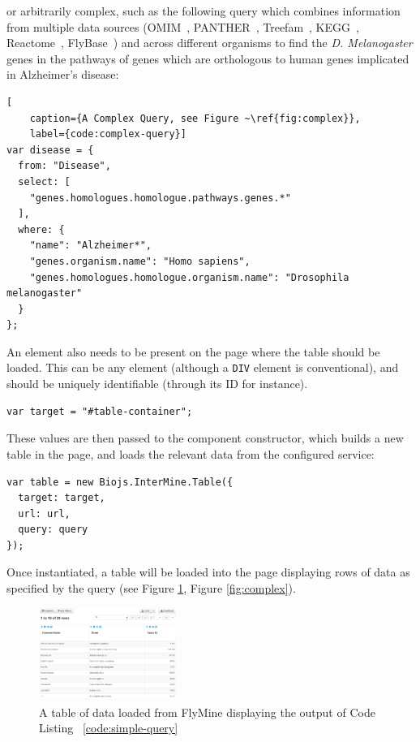 \documentclass[10pt,a4paper,twocolumn]{article}
\begin{document}
or arbitrarily complex, such as the following query which combines information
from multiple data sources (OMIM~\cite{omim}, PANTHER~\cite{panther},
Treefam~\cite{treefam}, KEGG~\cite{kegg}, Reactome~\cite{reactome},
FlyBase~\cite{flybase}) and across different organisms to find the \textit{D.
Melanogaster}  genes in the pathways of genes which are orthologous to human
genes implicated in Alzheimer's disease:

\begin{lstlisting}[
    caption={A Complex Query, see Figure ~\ref{fig:complex}},
    label={code:complex-query}]
var disease = {
  from: "Disease",
  select: [
    "genes.homologues.homologue.pathways.genes.*"
  ],
  where: {
    "name": "Alzheimer*",
    "genes.organism.name": "Homo sapiens",
    "genes.homologues.homologue.organism.name": "Drosophila melanogaster"
  }
};
\end{lstlisting}

An element also needs to be present on the page where the table should be
loaded. This can be any element (although a \texttt{DIV} element is
conventional), and should be uniquely identifiable (through its ID for
instance).

\begin{lstlisting}[caption={Defining the Target Element}, label={code:target-el}]
var target = "#table-container";
\end{lstlisting}

These values are then passed to the component constructor, which builds
a new table in the page, and loads the relevant data from the configured service:

\begin{lstlisting}[caption={Instantiation}, label={code:instantiation}]
var table = new Biojs.InterMine.Table({
  target: target,
  url: url,
  query: query
});
\end{lstlisting}

Once instantiated, a table will be loaded into the page displaying rows of data
as specified by the query (see Figure \ref{fig:1}, Figure \ref{fig:complex}).

\begin{figure}
\centering
\includegraphics[width=0.4\textwidth]{imtable.png}
\caption{
    \label{fig:1}
    A table of data loaded from FlyMine displaying the output
   of Code Listing ~\ref{code:simple-query}
}
\end{figure}
\end{document}
